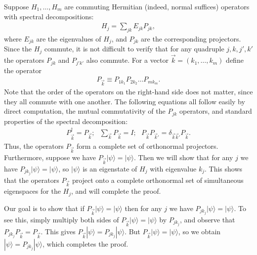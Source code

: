 \documentclass[12pt]{article}
\begin{document}
Suppose $H_1,\ldots,H_m$ are commuting Hermitian (indeed, normal
suffices) operators with spectral decompositions:
\begin{eqnarray}
  H_j = \sum_{jk} E_{jk} P_{jk},
\end{eqnarray}
where $E_{jk}$ are the eigenvalues of $H_j$, and $P_{jk}$ are the
corresponding projectors.  Since the $H_j$ commute, it is not
difficult to verify that for any quadruple $j,k,j',k'$ the operators
$P_{jk}$ and $P_{j'k'}$ also commute.  For a vector $\vec k =
(k_1,\ldots,k_m)$ define the operator
\begin{eqnarray}
  P_{\vec k} \equiv P_{1 k_1} P_{2 k_2} \ldots P_{m k_m}.
\end{eqnarray}
Note that the order of the operators on the right-hand side does not
matter, since they all commute with one another.  The following
equations all follow easily by direct computation, the mutual
commutativity of the $P_{jk}$ operators, and standard properties of
the spectral decomposition:
\begin{eqnarray}
  P_{\vec k}^\dagger = P_{\vec k}; \,\,\,\, \sum_{\vec k} P_{\vec k} = I; \,\,\,\, P_{\vec k} P_{\vec k'} = \delta_{\vec k \vec k'} P_{\vec k}.
\end{eqnarray}
Thus, the operators $P_{\vec k}$ form a complete set of orthonormal
projectors.  Furthermore, suppose we have $P_{\vec k} |\psi\rangle =
|\psi\rangle$.  Then we will show that for any $j$ we have $P_{jk_j}
|\psi\rangle = |\psi\rangle$, so $|\psi\rangle$ is an eigenstate of
$H_j$ with eigenvalue $k_j$.  This shows that the operators $P_{\vec
  k}$ project onto a complete orthonormal set of simultaneous
eigenspaces for the $H_j$, and will complete the proof.

Our goal is to show that if $P_{\vec k} |\psi\rangle = |\psi\rangle$
then for any $j$ we have $P_{jk_j} |\psi\rangle = |\psi\rangle$.  To
see this, simply multiply both sides of $P_{\vec k} |\psi\rangle =
|\psi\rangle$ by $P_{jk_j}$, and observe that $P_{jk_j} P_{\vec k} =
P_{\vec k}$.  This gives $P_{\vec k}|\psi\rangle =
P_{jk_j}|\psi\rangle$.  But $P_{\vec k}|\psi\rangle = |\psi\rangle$,
so we obtain $|\psi\rangle = P_{j k_j}|\psi\rangle$, which completes
the proof.

%
\end{document}
